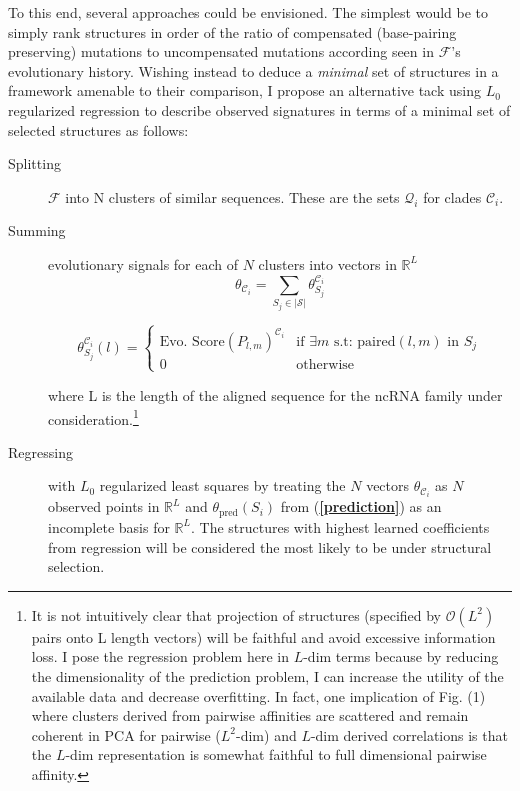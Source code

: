 \documentclass[12pt,a4paper]{article}
\begin{document}
To this end, several approaches could be envisioned. The simplest would be to simply rank structures in order of the ratio of compensated (base-pairing preserving) mutations to uncompensated mutations according seen in $\mathcal{F}$'s evolutionary history. Wishing instead to deduce a \emph{minimal} set of structures in a framework amenable to their comparison, I propose an alternative tack using $L_0$ regularized regression to describe observed signatures in terms of a minimal set of selected structures as follows:


\begin{description}
  \item[Splitting]  $\mathcal{F}$ into N clusters of similar sequences. These are the sets $\mathcal{Q}_i$ for clades $\mathcal{C}_i$.
    \item[Summing] evolutionary signals for each of $N$ clusters into vectors in $\mathbb{R}^L$
      \begin{equation*}
        \label{eq:sum}
        \theta_{\mathcal{C}_i} = \sum_{S_j\in|\mathcal{S}|}{\theta_{S_j}^{\mathcal{C}_i}}
      \end{equation*} 

      \begin{equation*} \theta_{S_j}^{\mathcal{C}_i}(l) = \left\{
          \begin{array}{rl} \text{Evo. Score}\left(P_{l,m} \right)^{\mathcal{C}_i}& \text{if } \exists m  \text{ s.t: paired}(l,m) \text{ in } S_j\\
            0 & \text{otherwise}\end{array} \right.
      \end{equation*} 

  where L is the length of the aligned sequence for the ncRNA family under consideration.\footnote{It is not intuitively clear that projection of structures (specified by $\mathcal{O}(L^2)$ pairs onto L length vectors) will be faithful and avoid excessive information loss. I pose the regression problem here in $L$-dim terms because by reducing the dimensionality of the prediction problem, I can increase the utility of the available data and decrease overfitting. In fact, one implication of Fig. (1) where clusters derived from pairwise affinities are scattered and remain coherent in PCA for pairwise ($L^2$-dim) and $L$-dim derived correlations is that the $L$-dim representation is somewhat faithful to full dimensional pairwise affinity. }
      \item[Regressing] with $L_0$ regularized least squares by treating the $N$ vectors $\theta_{\mathcal{C}_i}$ as $N$ observed points in $\mathbb{R}^L$ and $\theta_{\text{pred}}(S_i)$ from (\textbf{\ref{prediction}}) as an incomplete basis for $\mathbb{R}^L$. The structures with highest learned coefficients from regression will be considered the most likely to be under structural selection.
  \end{description}
\end{document}
